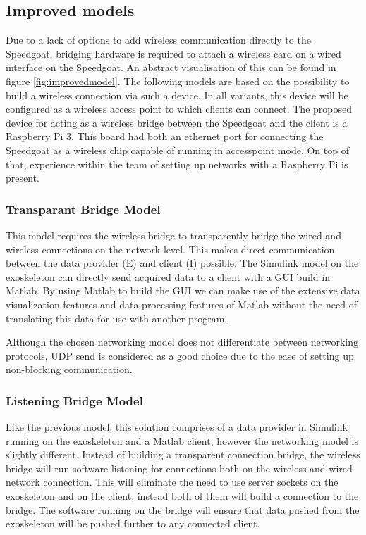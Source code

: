 \subsection{Improved models} \label{sec:impmod}
Due to a lack of options to add wireless communication directly to the Speedgoat, bridging hardware is required to attach a wireless card on a wired interface on the Speedgoat. An abstract visualisation of this can be found in figure \ref{fig:improvedmodel}. The following models are based on the possibility to build a wireless connection via such a device. In all variants, this device will be configured as a wireless access point to which clients can connect.
The proposed device for acting as a wireless bridge between the Speedgoat and the client is a Raspberry Pi 3. This board had both an ethernet port for connecting the Speedgoat as a wireless chip capable of running in accesspoint mode. On top of that, experience within the team of setting up networks with a Raspberry Pi is present.

\subsubsection{Transparant Bridge Model}\label{sec:tbm}
This model requires the wireless bridge to transparently bridge the wired and wireless connections on the network level. This makes direct communication between the data provider (E) and client (I) possible. The Simulink model on the exoskeleton can directly send acquired data to a client with a GUI build in Matlab. By using Matlab to build the GUI we can make use of the extensive data visualization features and data processing features of Matlab without the need of translating this data for use with another program. 

Although the chosen networking model does not differentiate between networking protocols, UDP send \cite{web:UDPSend} is considered as a good choice due to the ease of setting up non-blocking communication.

\subsubsection{Listening Bridge Model}\label{sec:lbm}
Like the previous model, this solution comprises of a data provider in Simulink running on the exoskeleton and a Matlab client, however the networking model is slightly different. Instead of building a transparent connection bridge, the wireless bridge will run software listening for connections both on the wireless and wired network connection. This will eliminate the need to use server sockets on the exoskeleton and on the client, instead both of them will build a connection to the bridge. The software running on the bridge will ensure that data pushed from the exoskeleton will be pushed further to any connected client.

